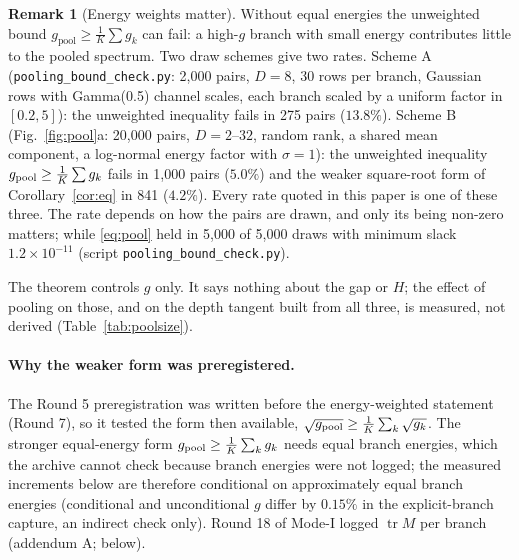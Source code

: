 \documentclass[11pt]{article}
\theoremstyle{definition}
\newtheorem{remark}[theorem]{Remark}
\newcommand{\tr}{\operatorname{tr}}
\begin{document}
\begin{remark}[Energy weights matter]\label{rem:energy}
Without equal energies the unweighted bound $g_{\mathrm{pool}}\ge\frac1K\sum g_k$ can fail: a high-$g$ branch with small energy contributes little to the pooled spectrum. Two draw schemes give two rates. Scheme A (\texttt{pooling\_bound\_check.py}: 2{,}000 pairs, $D=8$, 30 rows per branch, Gaussian rows with Gamma(0.5) channel scales, each branch scaled by a uniform factor in $[0.2,5]$): the unweighted inequality fails in 275 pairs ($13.8\%$). Scheme B (Fig.~\ref{fig:pool}a: 20{,}000 pairs, $D=2$--$32$, random rank, a shared mean component, a log-normal energy factor with $\sigma=1$): the unweighted inequality $g_{\rm pool}\ge\frac1K\sum g_k$ fails in 1{,}000 pairs ($5.0\%$) and the weaker square-root form of Corollary~\ref{cor:eq} in 841 ($4.2\%$). Every rate quoted in this paper is one of these three. The rate depends on how the pairs are drawn, and only its being non-zero matters; while \eqref{eq:pool} held in 5{,}000 of 5{,}000 draws with minimum slack $1.2\times10^{-11}$ (script \texttt{pooling\_bound\_check.py}).
\end{remark}

The theorem controls $g$ only. It says nothing about the gap or $H$; the effect of pooling on those, and on the depth tangent built from all three, is measured, not derived (Table~\ref{tab:poolsize}).

\paragraph{Why the weaker form was preregistered.} The Round 5 preregistration was written before the energy-weighted statement (Round 7), so it tested the form then available, $\sqrt{g_{\rm pool}}\ge\frac1K\sum_k\sqrt{g_k}$. The stronger equal-energy form $g_{\rm pool}\ge\frac1K\sum_kg_k$ needs equal branch energies, which the archive cannot check because branch energies were not logged; the measured increments below are therefore conditional on approximately equal branch energies (conditional and unconditional $g$ differ by $0.15\%$ in the explicit-branch capture, an indirect check only). Round 18 of Mode-I logged $\tr M$ per branch (addendum A; below).
\end{document}
